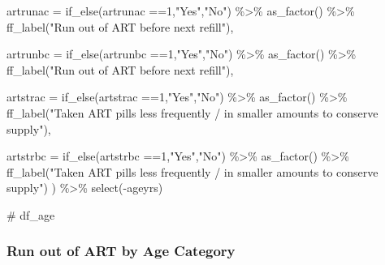 \documentclass[
  letterpaper,
  DIV=11,
  numbers=noendperiod]{scrartcl}
\newenvironment{Shaded}{\begin{snugshade}}{\end{snugshade}}
\newcommand{\AttributeTok}[1]{\textcolor[rgb]{0.40,0.45,0.13}{#1}}
\newcommand{\CommentTok}[1]{\textcolor[rgb]{0.37,0.37,0.37}{#1}}
\newcommand{\DecValTok}[1]{\textcolor[rgb]{0.68,0.00,0.00}{#1}}
\newcommand{\FunctionTok}[1]{\textcolor[rgb]{0.28,0.35,0.67}{#1}}
\newcommand{\NormalTok}[1]{\textcolor[rgb]{0.00,0.23,0.31}{#1}}
\newcommand{\SpecialCharTok}[1]{\textcolor[rgb]{0.37,0.37,0.37}{#1}}
\newcommand{\StringTok}[1]{\textcolor[rgb]{0.13,0.47,0.30}{#1}}
\begin{document}
\begin{Shaded}
\begin{Highlighting}[]
     \AttributeTok{artrunac =} \FunctionTok{if\_else}\NormalTok{(artrunac }\SpecialCharTok{==}\DecValTok{1}\NormalTok{,}\StringTok{"Yes"}\NormalTok{,}\StringTok{"No"}\NormalTok{) }\SpecialCharTok{\%\textgreater{}\%} 
    \FunctionTok{as\_factor}\NormalTok{() }\SpecialCharTok{\%\textgreater{}\%} 
    \FunctionTok{ff\_label}\NormalTok{(}\StringTok{"Run out of ART before next refill"}\NormalTok{),}
 
   \AttributeTok{artrunbc =} \FunctionTok{if\_else}\NormalTok{(artrunbc }\SpecialCharTok{==}\DecValTok{1}\NormalTok{,}\StringTok{"Yes"}\NormalTok{,}\StringTok{"No"}\NormalTok{) }\SpecialCharTok{\%\textgreater{}\%} 
    \FunctionTok{as\_factor}\NormalTok{() }\SpecialCharTok{\%\textgreater{}\%} 
    \FunctionTok{ff\_label}\NormalTok{(}\StringTok{"Run out of ART before next refill"}\NormalTok{),}
  
  \AttributeTok{artstrac =} \FunctionTok{if\_else}\NormalTok{(artstrac }\SpecialCharTok{==}\DecValTok{1}\NormalTok{,}\StringTok{"Yes"}\NormalTok{,}\StringTok{"No"}\NormalTok{) }\SpecialCharTok{\%\textgreater{}\%} 
    \FunctionTok{as\_factor}\NormalTok{() }\SpecialCharTok{\%\textgreater{}\%} 
    \FunctionTok{ff\_label}\NormalTok{(}\StringTok{"Taken ART pills less frequently / in smaller}
\StringTok{amounts to conserve supply"}\NormalTok{),}
  
  \AttributeTok{artstrbc =} \FunctionTok{if\_else}\NormalTok{(artstrbc }\SpecialCharTok{==}\DecValTok{1}\NormalTok{,}\StringTok{"Yes"}\NormalTok{,}\StringTok{"No"}\NormalTok{) }\SpecialCharTok{\%\textgreater{}\%} 
    \FunctionTok{as\_factor}\NormalTok{() }\SpecialCharTok{\%\textgreater{}\%} 
    \FunctionTok{ff\_label}\NormalTok{(}\StringTok{"Taken ART pills less frequently / in smaller}
\StringTok{amounts to conserve supply"}\NormalTok{)}
\NormalTok{  ) }\SpecialCharTok{\%\textgreater{}\%} 
  \FunctionTok{select}\NormalTok{(}\SpecialCharTok{{-}}\NormalTok{ageyrs)}
\end{Highlighting}
\end{Shaded}

\begin{Shaded}
\begin{Highlighting}[]
\CommentTok{\# df\_age}
\end{Highlighting}
\end{Shaded}

\subsubsection{Run out of ART by Age
Category}\label{run-out-of-art-by-age-category}
\end{document}
